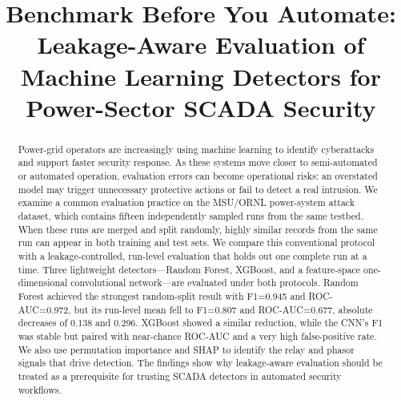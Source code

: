 \documentclass[conference,a4paper]{IEEEtran}
\begin{document}
\title{Benchmark Before You Automate: Leakage-Aware Evaluation of Machine Learning Detectors for Power-Sector SCADA Security}

\author{
\and
{}
\and
{}
}

\maketitle

\begin{abstract}
Power-grid operators are increasingly using machine learning to identify cyberattacks and support faster security response. As these systems move closer to semi-automated or automated operation, evaluation errors can become operational risks: an overstated model may trigger unnecessary protective actions or fail to detect a real intrusion. We examine a common evaluation practice on the MSU/ORNL power-system attack dataset, which contains fifteen independently sampled runs from the same testbed. When these runs are merged and split randomly, highly similar records from the same run can appear in both training and test sets. We compare this conventional protocol with a leakage-controlled, run-level evaluation that holds out one complete run at a time. Three lightweight detectors---Random Forest, XGBoost, and a feature-space one-dimensional convolutional network---are evaluated under both protocols. Random Forest achieved the strongest random-split result with F1=0.945 and ROC-AUC=0.972, but its run-level mean fell to F1=0.807 and ROC-AUC=0.677, absolute decreases of 0.138 and 0.296. XGBoost showed a similar reduction, while the CNN's F1 was stable but paired with near-chance ROC-AUC and a very high false-positive rate. We also use permutation importance and SHAP to identify the relay and phasor signals that drive detection. The findings show why leakage-aware evaluation should be treated as a prerequisite for trusting SCADA detectors in automated security workflows.
\end{abstract}
\end{document}
